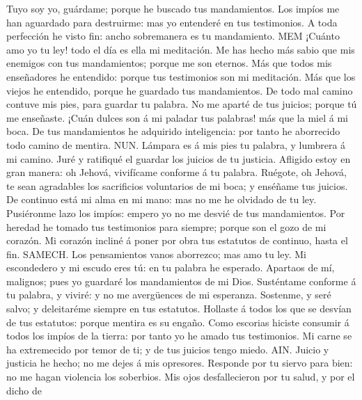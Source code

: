 Tuyo soy yo, guárdame; porque he buscado tus mandamientos.
 Los impíos me han aguardado para destruirme: mas yo
entenderé en tus testimonios.  A toda perfección he visto
fin: ancho sobremanera es tu mandamiento.  MEM ¡Cuánto
amo yo tu ley! todo el día es ella mi meditación.  Me has
hecho más sabio que mis enemigos con tus mandamientos; porque me son
eternos.  Más que todos mis enseñadores he entendido:
porque tus testimonios son mi meditación.  Más que los
viejos he entendido, porque he guardado tus mandamientos.
 De todo mal camino contuve mis pies, para guardar tu
palabra.  No me aparté de tus juicios; porque tú me
enseñaste.  ¡Cuán dulces son á mi paladar tus palabras!
más que la miel á mi boca.  De tus mandamientos he
adquirido inteligencia: por tanto he aborrecido todo camino de mentira.
 NUN. Lámpara es á mis pies tu palabra, y lumbrera á mi
camino.  Juré y ratifiqué el guardar los juicios de tu
justicia.  Afligido estoy en gran manera: oh Jehová,
vivifícame conforme á tu palabra.  Ruégote, oh Jehová,
te sean agradables los sacrificios voluntarios de mi boca; y enséñame
tus juicios.  De continuo está mi alma en mi mano: mas
no me he olvidado de tu ley.  Pusiéronme lazo los
impíos: empero yo no me desvié de tus mandamientos.  Por
heredad he tomado tus testimonios para siempre; porque son el gozo de mi
corazón.  Mi corazón incliné á poner por obra tus
estatutos de continuo, hasta el fin.  SAMECH. Los
pensamientos vanos aborrezco; mas amo tu ley.  Mi
escondedero y mi escudo eres tú: en tu palabra he esperado.
 Apartaos de mí, malignos; pues yo guardaré los
mandamientos de mi Dios.  Susténtame conforme á tu
palabra, y viviré: y no me avergüences de mi esperanza. 
Sostenme, y seré salvo; y deleitaréme siempre en tus estatutos.
 Hollaste á todos los que se desvían de tus estatutos:
porque mentira es su engaño.  Como escorias hiciste
consumir á todos los impíos de la tierra: por tanto yo he amado tus
testimonios.  Mi carne se ha extremecido por temor de
ti; y de tus juicios tengo miedo.  AIN. Juicio y
justicia he hecho; no me dejes á mis opresores. 
Responde por tu siervo para bien: no me hagan violencia los soberbios.
 Mis ojos desfallecieron por tu salud, y por el dicho de
